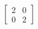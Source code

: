 \documentclass[preview]{standalone}
\begin{document}
\begin{align*}
\begin{bmatrix} 2 & 0 \\ 0 & 2 \end{bmatrix}
\end{align*}
\end{document}
